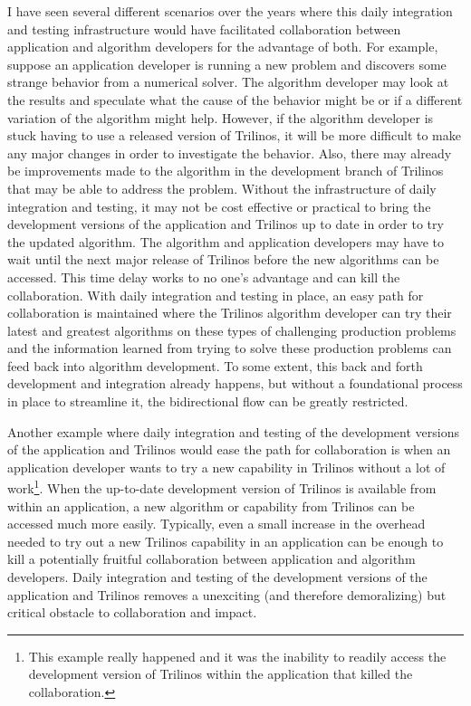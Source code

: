 \documentclass[pdf,ps2pdf,11pt]{SANDreport}
\begin{document}
I have seen several different scenarios over the years where this daily
integration and testing infrastructure would have facilitated collaboration
between application and algorithm developers for the advantage of both.  For
example, suppose an application developer is running a new problem and
discovers some strange behavior from a numerical solver.  The algorithm
developer may look at the results and speculate what the cause of the behavior
might be or if a different variation of the algorithm might help.  However, if
the algorithm developer is stuck having to use a released version of Trilinos,
it will be more difficult to make any major changes in order to investigate
the behavior.  Also, there may already be improvements made to the algorithm
in the development branch of Trilinos that may be able to address the problem.
Without the infrastructure of daily integration and testing, it may not be
cost effective or practical to bring the development versions of the
application and Trilinos up to date in order to try the updated algorithm.
The algorithm and application developers may have to wait until the next major
release of Trilinos before the new algorithms can be accessed.  This time
delay works to no one's advantage and can kill the collaboration.  With daily
integration and testing in place, an easy path for collaboration is maintained
where the Trilinos algorithm developer can try their latest and greatest
algorithms on these types of challenging production problems and the
information learned from trying to solve these production problems can feed
back into algorithm development.  To some extent, this back and forth
development and integration already happens, but without a foundational
process in place to streamline it, the bidirectional flow can be greatly
restricted.

Another example where daily integration and testing of the development versions
of the application and Trilinos would ease the path for collaboration is when
an application developer wants to try a new capability in Trilinos without a
lot of work\footnote{This example really happened and it was the inability to
readily access the development version of Trilinos within the application that
killed the collaboration.}.  When the up-to-date development version of
Trilinos is available from within an application, a new algorithm or
capability from Trilinos can be accessed much more easily.  Typically, even a
small increase in the overhead needed to try out a new Trilinos capability in
an application can be enough to kill a potentially fruitful collaboration
between application and algorithm developers.  Daily integration and testing
of the development versions of the application and Trilinos removes a
unexciting (and therefore demoralizing) but critical obstacle to collaboration
and impact.
\end{document}
